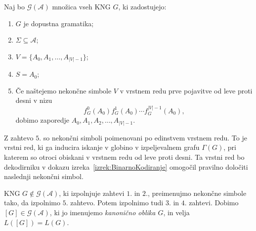 \documentclass[fin1, tisk]{fmfdelo}
\providecommand{\abs}[1]{\left\lvert #1 \right\rvert}
\newcommand{\A}{\mathcal{A}}
\newcommand{\G}{\mathcal{G}}
\theoremstyle{definition}
\begin{document}
\begin{definicija}\label{def:G(A)} 
    Naj bo $\G(\A)$ množica vseh KNG $G$, ki zadostujejo:
    \begin{enumerate}
        \item $G$ je dopustna gramatika;
        \item $\Sigma \subseteq \A$;
        \item $V = \{ A_0, A_1, \ldots, A_{\abs{V}-1} \}$;
        \item $S=A_0$;
        \item Če naštejemo nekončne simbole $V$ v vrstnem redu prve pojavitve od leve proti desni
        v nizu
        \[
            f_G^0(A_0)f_G^1(A_0) \cdots f_G^{\abs{V}-1}(A_0),
        \]
        dobimo zaporedje $A_0, A_1, A_2, \ldots, A_{\abs{V}-1}$.
    \end{enumerate}
    Z zahtevo $5.$ so nekončni simboli poimenovani po edinstvem vrstnem redu. To je vrstni red, 
    ki ga inducira iskanje v globino v izpeljevalnem grafu $\Gamma(G)$, pri katerem so otroci
    obiskani v vrstnem redu od leve proti desni. Ta vrstni red bo dekodirniku v dokazu 
    izreka~\ref{izrek:BinarnoKodiranje} omogočil pravilno določiti naslednji nekončni simbol.

    KNG $G \notin \G(\A)$, ki izpolnjuje zahtevi $1.$ in $2.$, preimenujmo nekončne simbole
    tako, da izpolnimo $5.$ zahtevo. Potem izpolnimo tudi $3.$ in $4.$ zahtevi. Dobimo
    $[G] \in \G(\A)$, ki jo imenujemo \emph{kanonično oblika $G$}, in velja $L([G]) = L(G)$.
\end{definicija}
\end{document}
